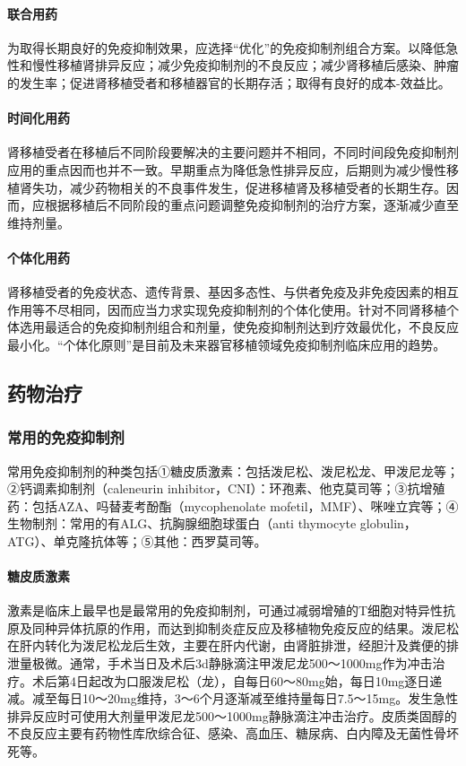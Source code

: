 \paragraph{联合用药}

为取得长期良好的免疫抑制效果，应选择“优化”的免疫抑制剂组合方案。以降低急性和慢性移植肾排异反应；减少免疫抑制剂的不良反应；减少肾移植后感染、肿瘤的发生率；促进肾移植受者和移植器官的长期存活；取得有良好的成本-效益比。
\paragraph{时间化用药}

肾移植受者在移植后不同阶段要解决的主要问题并不相同，不同时间段免疫抑制剂应用的重点因而也并不一致。早期重点为降低急性排异反应，后期则为减少慢性移植肾失功，减少药物相关的不良事件发生，促进移植肾及移植受者的长期生存。因而，应根据移植后不同阶段的重点问题调整免疫抑制剂的治疗方案，逐渐减少直至维持剂量。
\paragraph{个体化用药}

肾移植受者的免疫状态、遗传背景、基因多态性、与供者免疫及非免疫因素的相互作用等不尽相同，因而应当力求实现免疫抑制剂的个体化使用。针对不同肾移植个体选用最适合的免疫抑制剂组合和剂量，使免疫抑制剂达到疗效最优化，不良反应最小化。“个体化原则”是目前及未来器官移植领域免疫抑制剂临床应用的趋势。

\subsection{药物治疗}

\subsubsection{常用的免疫抑制剂}

常用免疫抑制剂的种类包括①糖皮质激素：包括泼尼松、泼尼松龙、甲泼尼龙等；②钙调素抑制剂（caleneurin
inhibitor，CNI）：环孢素、他克莫司等；③抗增殖药：包括AZA、吗替麦考酚酯（mycophenolate
mofetil，MMF）、咪唑立宾等；④生物制剂：常用的有ALG、抗胸腺细胞球蛋白（anti
thymocyte globulin，ATG）、单克隆抗体等；⑤其他：西罗莫司等。
\paragraph{糖皮质激素}

激素是临床上最早也是最常用的免疫抑制剂，可通过减弱增殖的T细胞对特异性抗原及同种异体抗原的作用，而达到抑制炎症反应及移植物免疫反应的结果。泼尼松在肝内转化为泼尼松龙后生效，主要在肝内代谢，由肾脏排泄，经胆汁及粪便的排泄量极微。通常，手术当日及术后3d静脉滴注甲泼尼龙500～1000mg作为冲击治疗。术后第4日起改为口服泼尼松（龙），自每日60～80mg始，每日10mg逐日递减。减至每日10～20mg维持，3～6个月逐渐减至维持量每日7.5～15mg。发生急性排异反应时可使用大剂量甲泼尼龙500～1000mg静脉滴注冲击治疗。皮质类固醇的不良反应主要有药物性库欣综合征、感染、高血压、糖尿病、白内障及无菌性骨坏死等。
